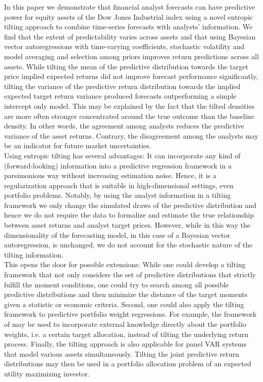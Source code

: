\noindent In this paper we demonstrate that financial analyst forecasts can have predictive power for equity assets of the Dow Jones Industrial index using a novel entropic tilting approach to combine time-series forecasts with analysts' information. We find that the extent of predictability varies across assets and that using Bayesian vector autoregressions with time-varying coefficients, stochastic volatility and model averaging and selection among priors improves return predictions across all assets. While tilting the mean of the predictive distribution towards the target price implied expected returns did not improve forecast performance significantly, tilting the variance of the predictive return distribution towards the implied expected target return variance produced forecasts outperforming a simple intercept only model. This may be explained by the fact that the tilted densities are more often stronger concentrated around the true outcome than the baseline density. In other words, the agreement among analysts reduces the predictive variance of the asset returns. Contrary, the disagreement among the analysts may be an indicator for future market uncertainties.\\
%
\indent Using entropic tilting has several advantages: It can incorporate any kind of (forward-looking) information into a predictive regression framework in a parsimonious way without increasing estimation noise. Hence, it is a regularization approach that is suitable in high-dimensional settings, even portfolio problems. %
Notably, by using the analyst information in a tilting framework we only change the simulated draws of the predictive distribution and hence we do not require the data to formalize and estimate the true relationship between asset returns and analyst target prices. However, while in this way the dimensionality of the forecasting model, in this case of a Bayesian vector autoregression, is unchanged, we do not account for the stochastic nature of the tilting information.\\
%
\indent This opens the door for possible extensions: While one could develop a tilting framework that not only considers the set of predictive distributions that strictly fulfill the moment conditions, one could try to search among all possible predictive distributions and then minimize the distance of the target moments given a statistic or economic criteria. Second, one could also apply the tilting framework to predictive portfolio weight regressions. For example, the framework of \citep{frey2016a} may be used to incorporate external knowledge directly about the portfolio weights, i.e. a certain target allocation, instead of tilting the underlying return process. Finally, the tilting approach is also applicable for panel VAR systems that model various assets simultaneously. Tilting the joint predictive return distributions may then be used in a portfolio allocation problem of an expected utility maximizing investor.
